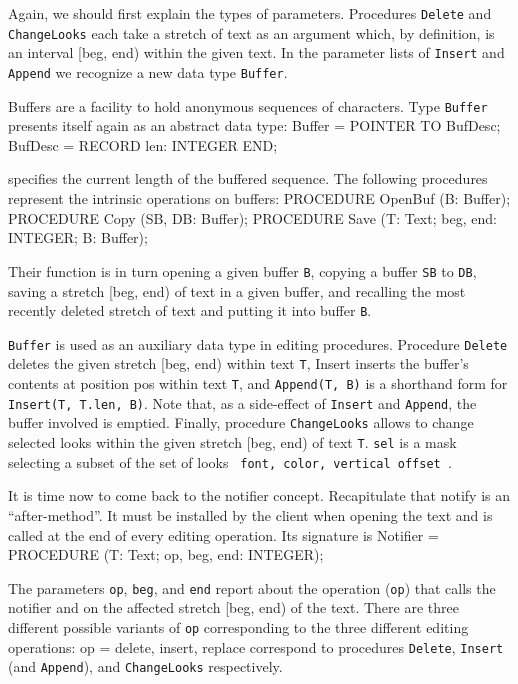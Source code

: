 \noindent Again, we should first explain the types of parameters. Procedures
{\tt Delete\/} and {\tt ChangeLooks\/} each take a stretch of text as an argument
which, by definition, is an interval [beg, end) within the given
text. In the parameter lists of {\tt Insert\/} and {\tt Append\/} we recognize a new
data type {\tt Buffer\/}.

Buffers are a facility to hold anonymous sequences of characters. Type
{\tt Buffer\/} presents itself again as an abstract data type:
\begintt  
Buffer = POINTER TO BufDesc;
BufDesc = RECORD
  len: INTEGER
END;
\endtt

 specifies the current length of the buffered sequence. The
following procedures represent the intrinsic operations on buffers:
\begintt
PROCEDURE OpenBuf (B: Buffer);
PROCEDURE Copy (SB, DB: Buffer);
PROCEDURE Save (T: Text; beg, end: INTEGER; B: Buffer);
\endtt

\noindent Their function is in turn opening a given buffer {\tt B\/}, copying a buffer
{\tt SB\/} to {\tt DB\/}, saving a stretch [beg, end) of text in a given buffer, and
recalling the most recently deleted stretch of text and putting it
into buffer {\tt B\/}.

{\tt Buffer\/} is used as an auxiliary data type in editing
procedures. Procedure {\tt Delete\/} deletes the given stretch [beg, end)
within text {\tt T\/}, Insert inserts the buffer's contents at position pos
within text {\tt T\/}, and {\tt Append(T, B)\/} is a shorthand form for {\tt Insert(T, T.len, B)\/}. Note that, as a side-effect of {\tt Insert\/} and {\tt Append\/}, the
buffer involved is emptied. Finally, procedure {\tt ChangeLooks\/} allows to
change selected looks within the given stretch [beg, end) of text
{\tt T\/}. {\tt sel\/} is a mask selecting a subset of the set of looks {\tt { font,
color, vertical offset }\/}.

It is time now to come back to the notifier concept. Recapitulate that
notify is an ``after-method''. It must be installed by the client when
opening the text and is called at the end of every editing
operation. Its signature is
\begintt
Notifier = PROCEDURE (T: Text; op, beg, end: INTEGER);
\endtt

\noindent The parameters {\tt op\/}, {\tt beg\/}, and {\tt end\/} report about the operation ({\tt op\/}) that
calls the notifier and on the affected stretch [beg, end) of the
text. There are three different possible variants of {\tt op\/}
corresponding to the three different editing operations: op =
delete, insert, replace correspond to procedures {\tt Delete\/}, {\tt Insert\/} (and
{\tt Append\/}), and {\tt ChangeLooks\/} respectively.

